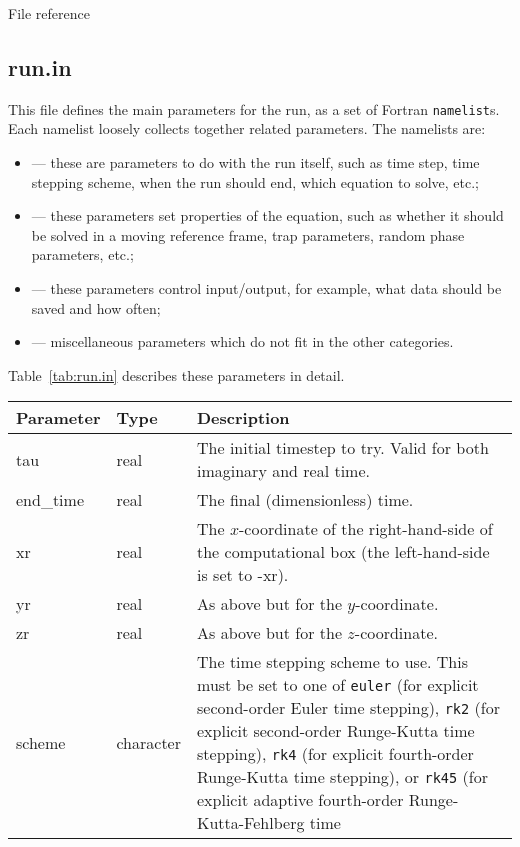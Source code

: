 \begin{chapter}{\label{cha:file_reference}File reference}
  \subsection{\label{subsec:run.in}run.in}
  This file defines the main parameters for the run, as a set of Fortran
  \verb"namelist"s.  Each namelist loosely collects together related
  parameters.  The namelists are:
  \begin{itemize}
    \item {} --- these are parameters to do with the run
      itself, such as time step, time stepping scheme, when the run should end,
      which equation to solve, etc.;
    \item {} --- these parameters set properties of the
      equation, such as whether it should be solved in a moving reference
      frame, trap parameters, random phase parameters, etc.;
    \item {} --- these parameters control input/output, for
      example, what data should be saved and how often;
    \item {} --- miscellaneous parameters which do not fit
      in the other categories.
  \end{itemize}
  Table~\ref{tab:run.in} describes these parameters in detail.
  \begin{center}
    \begin{longtable}[ht]{llp{}}
      Parameter & Type & Description \\
      \hline
      tau & real & The initial timestep to try.  Valid for both imaginary and
      real time. \\
      end\_time & real & The final (dimensionless) time. \\
      xr & real & The $x$-coordinate of the right-hand-side of the
      computational box (the left-hand-side is set to -xr). \\
      yr & real & As above but for the $y$-coordinate. \\
      zr & real & As above but for the $z$-coordinate. \\
      scheme & character & The time stepping scheme to use.  This must be set
      to one of \verb"euler" (for explicit second-order Euler time stepping),
      \verb"rk2" (for explicit second-order Runge-Kutta time stepping),
      \verb"rk4" (for explicit fourth-order Runge-Kutta time stepping), or
      \verb"rk45" (for explicit adaptive fourth-order Runge-Kutta-Fehlberg time

\end{longtable}
\end{center}
\end{chapter}
